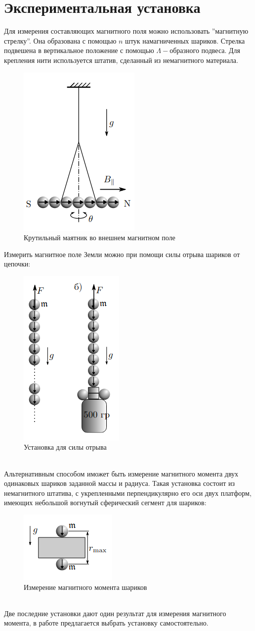 \documentclass[a4paper, 12pt]{article}
\begin{document}
\section*{Экспериментальная установка}
Для измерения составляющих магнитного поля можно использовать ''магнитную стрелку''. Она образована с помощью $n$ штук намагниченных шариков. Стрелка подвешена в вертикальное положение с помощью $\Lambda-$образного подвеса. Для крепления нити используется штатив, сделанный из немагнитного материала.
\begin{figure}[h]
        \centering
        \includegraphics[width=0.25\linewidth]{p1.png}
        \caption{Крутильный маятник во внешнем магнитном поле}
        \label{Подвес}
\end{figure}
\newpage
Измерить магнитное поле Земли можно при помощи силы отрыва шариков от цепочки:
\begin{figure}[h]
    \centering
    \includegraphics[width=0.25\linewidth]{p2.png}
    \caption{Установка для силы отрыва}
    \label{установка для силы отрыва}
\end{figure}\\
Альтернативным способом иможет быть измерение магнитного момента двух одинаковых шариков заданной массы и радиуса.
Такая установка состоит из немагнитного штатива, с укрепленными перпендикулярно его оси двух платформ, имеющих небольшой вогнутый сферический сегмент
для шариков:
\begin{figure}[h]
    \centering
    \includegraphics[width=0.25\linewidth]{p3.png}
    \caption{Измерение магнитного момента шариков}
    \label{установка измерение магнитного момента шариков}
\end{figure}\\
Две последние установки дают один результат для измерения магнитного момента, в работе предлагается выбрать установку самостоятельно.
\end{document}
